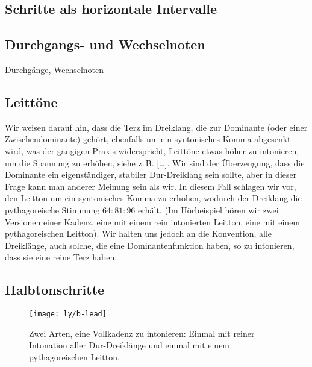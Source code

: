 \subsection{Schritte als horizontale Intervalle}

\subsection{Durchgangs- und Wechselnoten}

Durchgänge, Wechselnoten

\subsection{Leittöne}
\label{sec:ln}

Wir weisen darauf hin, dass die Terz im Dreiklang, die zur Dominante (oder einer
Zwischendominante) gehört, ebenfalls um ein syntonisches Komma abgesenkt wird,
was der gängigen Praxis widerspricht, Leittöne etwas höher zu intonieren, um die
Spannung zu erhöhen, siehe z.\,B. […]. Wir sind der
Überzeugung, dass die Dominante ein eigenständiger, stabiler Dur-Dreiklang sein
sollte, aber in dieser Frage kann man anderer Meinung sein als wir. In diesem
Fall schlagen wir vor, den Leitton um ein syntonisches Komma zu erhöhen, wodurch
der Dreiklang die pythagoreische Stimmung $64:81:96$ erhält. (Im Hörbeispiel
hören wir zwei Versionen einer Kadenz, eine mit einem rein intonierten Leitton,
eine mit einem pythagoreischen Leitton). Wir halten uns jedoch an die
Konvention, alle Dreiklänge, auch solche, die eine Dominantenfunktion haben, so
zu intonieren, dass sie eine reine Terz haben.

\subsection{Halbtonschritte}
\label{sec:semi}

\begin{figure}
  \centering
  \texttt{[image: ly/b-lead]}
  \caption{Zwei Arten, eine Vollkadenz zu intonieren: Einmal mit reiner
  	Intonation aller Dur-Dreiklänge und einmal mit einem pythagoreischen
  	Leitton.}\label{fig:lead}
\end{figure}

